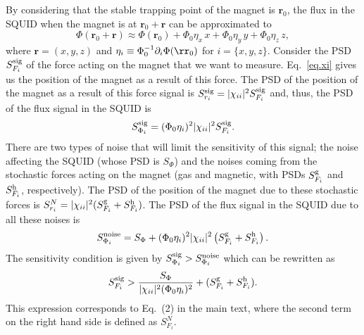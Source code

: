 \documentclass[twocolumn,superscriptaddress,floatfix,preprintnumbers,prl]{revtex4}
\begin{document}
By considering that the stable trapping point of the magnet is $\mathbf{r}_0$, the flux in the SQUID when the magnet is at $\mathbf{r}_0+\mathbf{r}$ can be approximated to 
\begin{equation}
\Phi(\mathbf{r}_0+\mathbf{r})\approx \Phi(\mathbf{r}_0)+\Phi_0 \eta_x \,x+\Phi_0 \eta_y \,y +\Phi_0 \eta_z \,z, \label{eq.fl}
\end{equation}
where $\mathbf{r}=(x,y,z)$ and $\eta_i\equiv \Phi_0^{-1}\partial_i\Phi(\rr_0)$ for $i=\{x,y,z\}$. Consider the PSD $S_{F_i}^{\rm sig}$ of the force  acting on the magnet that we want to measure. Eq.~\eqref{eq.xi} gives us the position of the magnet as a result of this force. 
The PSD of the position of the magnet as a result of this force signal is $S_{r_i}^{\rm sig}=|\chi_{ii}|^2 S_{F_i}^{\rm sig}$ and, thus, the PSD of the flux signal in the SQUID is
\begin{equation}
S_{\Phi_i}^{\rm sig}=(\Phi_0 \eta_i)^2|\chi_{ii}|^2 S_{F_i}^{\rm sig}.
\end{equation}
There are two types of noise that will limit the sensitivity of this signal; the noise affecting the SQUID (whose PSD is $S_\Phi$) and the noises coming from the stochastic forces acting on the magnet (gas and magnetic, with PSDs $S_{F_i}^{\rm g}$ and $S_{F_i}^{\rm h}$, respectively). The PSD of the position of the magnet due to these stochastic forces is $S_{r_i}^N=|\chi_{ii}|^2(S_{F_i}^{\rm g}+S_{F_i}^{\rm h})$.
The PSD of the flux signal in the SQUID due to all these noises is
\begin{equation}
S_{\Phi_i}^{\rm noise}=S_{\Phi}+(\Phi_0 \eta_i)^2 |\chi_{ii}|^2\left(S_{F_i}^{\rm g}+S_{F_i}^{\rm h}\right).
\end{equation}
The sensitivity condition is given by $S_{\Phi_i}^{\rm sig}>S_{\Phi_i}^{\rm noise}$ which can be rewritten as 
\begin{equation}
S_{F_i}^{\rm sig}>\frac{S_{\Phi}}{|\chi_{ii}|^2(\Phi_0 \eta_i)^2}+(S_{F_i}^{\rm g}+S_{F_i}^{\rm h}).
\end{equation}
This expression corresponds to Eq.~(2) in the main text, where the second term on the right hand side is defined as $S_{F_i}^N$. %
\end{document}
